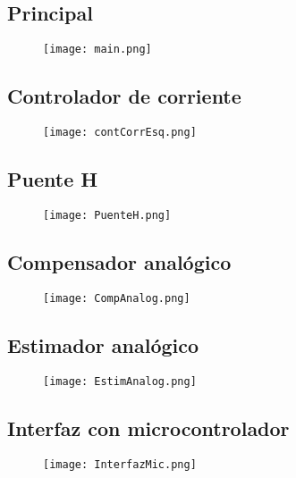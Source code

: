 \subsection{Principal}
\begin{figure}[H]
	\centering
	\texttt{[image: main.png]}
	\label{fig:main}
\end{figure}

\subsection{Controlador de corriente}
\begin{figure}[H]
	\centering
	\texttt{[image: contCorrEsq.png]}
	\label{fig:contCorrEsq}
\end{figure}

\subsection{Puente H}
\begin{figure}[H]
	\centering
	\texttt{[image: PuenteH.png]}
	\label{fig:PuenteH}
\end{figure}

\subsection{Compensador analógico}
\begin{figure}[H]
	\centering
	\texttt{[image: CompAnalog.png]}
	\label{fig:CompAnalog}
\end{figure}

\subsection{Estimador analógico}
\begin{figure}[H]
	\centering
	\texttt{[image: EstimAnalog.png]}
	\label{fig:EstimAnalog}
\end{figure}

\subsection{Interfaz con microcontrolador}
\begin{figure}[H]
	\centering
	\texttt{[image: InterfazMic.png]}
	\label{fig:InterfazMic}
\end{figure}


